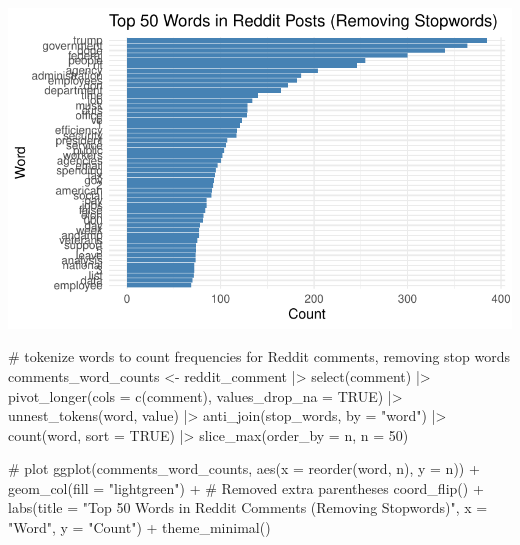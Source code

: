 \documentclass[
  letterpaper,
  DIV=11,
  numbers=noendperiod]{scrartcl}
\newenvironment{Shaded}{\begin{snugshade}}{\end{snugshade}}
\newcommand{\AttributeTok}[1]{\textcolor[rgb]{0.40,0.45,0.13}{#1}}
\newcommand{\CommentTok}[1]{\textcolor[rgb]{0.37,0.37,0.37}{#1}}
\newcommand{\ConstantTok}[1]{\textcolor[rgb]{0.56,0.35,0.01}{#1}}
\newcommand{\DecValTok}[1]{\textcolor[rgb]{0.68,0.00,0.00}{#1}}
\newcommand{\FunctionTok}[1]{\textcolor[rgb]{0.28,0.35,0.67}{#1}}
\newcommand{\NormalTok}[1]{\textcolor[rgb]{0.00,0.23,0.31}{#1}}
\newcommand{\OtherTok}[1]{\textcolor[rgb]{0.00,0.23,0.31}{#1}}
\newcommand{\SpecialCharTok}[1]{\textcolor[rgb]{0.37,0.37,0.37}{#1}}
\newcommand{\StringTok}[1]{\textcolor[rgb]{0.13,0.47,0.30}{#1}}
\begin{document}
\includegraphics{Reddit_eda_files/figure-pdf/unnamed-chunk-7-1.pdf}

\begin{Shaded}
\begin{Highlighting}[]
\CommentTok{\# tokenize words to count frequencies for Reddit comments, removing stop words}
\NormalTok{comments\_word\_counts }\OtherTok{\textless{}{-}}\NormalTok{ reddit\_comment }\SpecialCharTok{|\textgreater{}}
  \FunctionTok{select}\NormalTok{(comment) }\SpecialCharTok{|\textgreater{}}
  \FunctionTok{pivot\_longer}\NormalTok{(}\AttributeTok{cols =} \FunctionTok{c}\NormalTok{(comment), }\AttributeTok{values\_drop\_na =} \ConstantTok{TRUE}\NormalTok{) }\SpecialCharTok{|\textgreater{}}
  \FunctionTok{unnest\_tokens}\NormalTok{(word, value) }\SpecialCharTok{|\textgreater{}}
  \FunctionTok{anti\_join}\NormalTok{(stop\_words, }\AttributeTok{by =} \StringTok{"word"}\NormalTok{) }\SpecialCharTok{|\textgreater{}}
  \FunctionTok{count}\NormalTok{(word, }\AttributeTok{sort =} \ConstantTok{TRUE}\NormalTok{) }\SpecialCharTok{|\textgreater{}}
  \FunctionTok{slice\_max}\NormalTok{(}\AttributeTok{order\_by =}\NormalTok{ n, }\AttributeTok{n =} \DecValTok{50}\NormalTok{)}

\CommentTok{\# plot}
\FunctionTok{ggplot}\NormalTok{(comments\_word\_counts, }\FunctionTok{aes}\NormalTok{(}\AttributeTok{x =} \FunctionTok{reorder}\NormalTok{(word, n), }\AttributeTok{y =}\NormalTok{ n)) }\SpecialCharTok{+}
  \FunctionTok{geom\_col}\NormalTok{(}\AttributeTok{fill =} \StringTok{"lightgreen"}\NormalTok{) }\SpecialCharTok{+}  \CommentTok{\# Removed extra parentheses}
  \FunctionTok{coord\_flip}\NormalTok{() }\SpecialCharTok{+}
  \FunctionTok{labs}\NormalTok{(}\AttributeTok{title =} \StringTok{"Top 50 Words in Reddit Comments (Removing Stopwords)"}\NormalTok{,}
       \AttributeTok{x =} \StringTok{"Word"}\NormalTok{,}
       \AttributeTok{y =} \StringTok{"Count"}\NormalTok{) }\SpecialCharTok{+}
  \FunctionTok{theme\_minimal}\NormalTok{()}
\end{Highlighting}
\end{Shaded}
\end{document}
